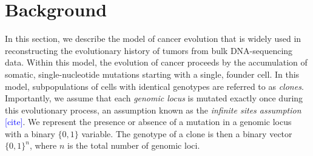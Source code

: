 \documentclass[10pt]{article}
\newcommand{\henri}[1]{\textcolor{blue}{[#1]}}
\begin{document}

\newpage
\section{Background}

In this section, we describe the model of cancer evolution that is widely used 
\cite{malikic_clonality_2015, el-kebir_reconstruction_2015, deshwar_phylowgs_2015, 
satas_tumor_2017, myers_calder_2019, wintersinger_reconstructing_2022} 
in reconstructing the evolutionary history of tumors from bulk DNA-sequencing data. Within this model,
the evolution of cancer proceeds by the accumulation of somatic, single-nucleotide
mutations starting with a single, founder cell. 
In this model, subpopulations of cells with identical genotypes are referred to as \emph{clones}.
Importantly, we assume that each \emph{genomic locus} is mutated exactly
once during this evolutionary process, an assumption known as the \emph{infinite sites assumption} \henri{cite}. We
represent the presence or absence of a mutation in a genomic locus with a binary $\{0, 1\}$ variable. The 
genotype of a clone is then a binary vector $\{0, 1\}^n$, where $n$ is the total number of genomic loci.
\end{document}
